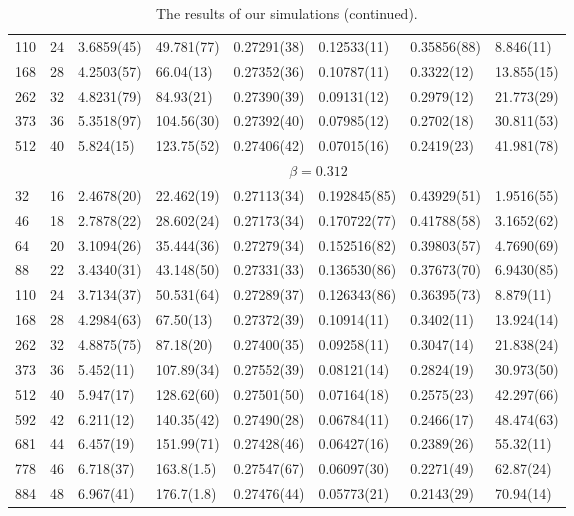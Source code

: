 \documentclass[12pt]{article}
\begin{document}
\begin{table}
\begin{tabular}{llllllll}
110 & 24 & 3.6859(45) & 49.781(77) & 0.27291(38) & 0.12533(11) & 0.35856(88) & 8.846(11)\\ 
168 & 28 & 4.2503(57) & 66.04(13) & 0.27352(36) & 0.10787(11) & 0.3322(12) & 13.855(15)\\ 
262 & 32 & 4.8231(79) & 84.93(21) & 0.27390(39) & 0.09131(12) & 0.2979(12) & 21.773(29)\\ 
373 & 36 & 5.3518(97) & 104.56(30) & 0.27392(40) & 0.07985(12) & 0.2702(18) & 30.811(53)\\ 
512 & 40 & 5.824(15) & 123.75(52) & 0.27406(42) & 0.07015(16) & 0.2419(23) & 41.981(78)\\ 
\hline 
  & & \multicolumn{6}{c}{$ \beta = 0.312 $} \\ 
 \hline 
32 & 16 & 2.4678(20) & 22.462(19) & 0.27113(34) & 0.192845(85) & 0.43929(51) & 1.9516(55)\\ 
46 & 18 & 2.7878(22) & 28.602(24) & 0.27173(34) & 0.170722(77) & 0.41788(58) & 3.1652(62)\\ 
64 & 20 & 3.1094(26) & 35.444(36) & 0.27279(34) & 0.152516(82) & 0.39803(57) & 4.7690(69)\\ 
88 & 22 & 3.4340(31) & 43.148(50) & 0.27331(33) & 0.136530(86) & 0.37673(70) & 6.9430(85)\\ 
110 & 24 & 3.7134(37) & 50.531(64) & 0.27289(37) & 0.126343(86) & 0.36395(73) & 8.879(11)\\ 
168 & 28 & 4.2984(63) & 67.50(13) & 0.27372(39) & 0.10914(11) & 0.3402(11) & 13.924(14)\\ 
262 & 32 & 4.8875(75) & 87.18(20) & 0.27400(35) & 0.09258(11) & 0.3047(14) & 21.838(24)\\ 
373 & 36 & 5.452(11) & 107.89(34) & 0.27552(39) & 0.08121(14) & 0.2824(19) & 30.973(50)\\ 
512 & 40 & 5.947(17) & 128.62(60) & 0.27501(50) & 0.07164(18) & 0.2575(23) & 42.297(66)\\ 
592 & 42 & 6.211(12) & 140.35(42) & 0.27490(28) & 0.06784(11) & 0.2466(17) & 48.474(63)\\ 
681 & 44 & 6.457(19) & 151.99(71) & 0.27428(46) & 0.06427(16) & 0.2389(26) & 55.32(11)\\ 
778 & 46 & 6.718(37) & 163.8(1.5) & 0.27547(67) & 0.06097(30) & 0.2271(49) & 62.87(24)\\ 
884 & 48 & 6.967(41) & 176.7(1.8) & 0.27476(44) & 0.05773(21) & 0.2143(29) & 70.94(14)\\ 
\hline 
 \end{tabular}
  \caption{The results of our simulations (continued).}
  \label{tab:observables2}
\end{table}
\end{document}
